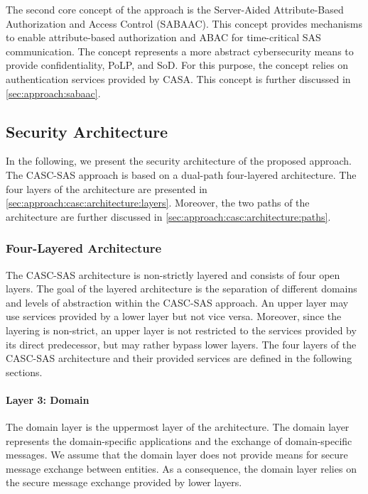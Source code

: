 The second core concept of the approach is the Server-Aided Attribute-Based Authorization and Access Control (SABAAC).
This concept provides mechanisms to enable attribute-based authorization and ABAC for time-critical SAS communication.
The concept represents a more abstract cybersecurity means to provide confidentiality, PoLP, and SoD.
For this purpose, the concept relies on authentication services provided by CASA.
This concept is further discussed in \autoref{sec:approach:sabaac}.

\subsection{Security Architecture}
In the following, we present the security architecture of the proposed approach.
The CASC-SAS approach is based on a dual-path four-layered architecture.
The four layers of the architecture are presented in \autoref{sec:approach:casc:architecture:layers}.
Moreover, the two paths of the architecture are further discussed in \autoref{sec:approach:casc:architecture:paths}.

\subsubsection{Four-Layered Architecture}
\label{sec:approach:casc:architecture:layers}
The CASC-SAS architecture is non-strictly layered and consists of four open layers.
The goal of the layered architecture is the separation of different domains and levels of abstraction within the CASC-SAS approach.
An upper layer may use services provided by a lower layer but not vice versa.
Moreover, since the layering is non-strict, an upper layer is not restricted to the services provided by its direct predecessor, but may rather bypass lower layers.
The four layers of the CASC-SAS architecture and their provided services are defined in the following sections.

\paragraph{Layer 3: Domain}
The domain layer is the uppermost layer of the architecture.
The domain layer represents the domain-specific applications and the exchange of domain-specific messages.
We assume that the domain layer does not provide means for secure message exchange between entities.
As a consequence, the domain layer relies on the secure message exchange provided by lower layers.

